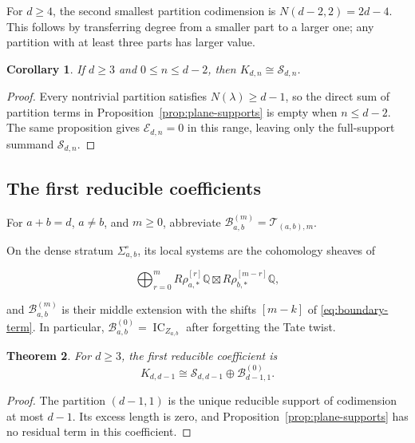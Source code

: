 \documentclass[11pt,reqno]{amsart}
\newtheorem{theorem}{Theorem}[section]
\newtheorem{corollary}[theorem]{Corollary}
\theoremstyle{definition}
\newcommand{\Q}{\mathbb Q}
\newcommand{\IC}{\operatorname{IC}}
\begin{document}
For $d\ge4$, the second smallest partition codimension is
$N(d-2,2)=2d-4$.  This follows by transferring degree from a smaller part to
a larger one; any partition with at least three parts has larger value.

\begin{corollary}\label{cor:before-first-boundary}
If $d\ge3$ and $0\le n\le d-2$, then
$K_{d,n}\cong\mathcal S_{d,n}$.
\end{corollary}

\begin{proof}
Every nontrivial partition satisfies $N(\lambda)\ge d-1$, so the direct sum
of partition terms in Proposition~\ref{prop:plane-supports} is empty when
$n\le d-2$.  The same proposition gives $\mathcal E_{d,n}=0$ in this range,
leaving only the full-support summand $\mathcal S_{d,n}$.
\end{proof}

\subsection{The first reducible coefficients}

For $a+b=d$, $a\ne b$, and $m\ge0$, abbreviate
$\mathcal B_{a,b}^{(m)}=\mathcal T_{(a,b),m}$.

On the dense stratum $\Sigma_{a,b}^\circ$, its local systems are the
cohomology sheaves of

\begin{equation}\label{eq:two-component-local-complex}
  \bigoplus_{r=0}^{m}
  R\rho_{a,*}^{[r]}\Q
  \boxtimes
  R\rho_{b,*}^{[m-r]}\Q,
\end{equation}

and $\mathcal B_{a,b}^{(m)}$ is their middle extension with the shifts
$[m-k]$ of \eqref{eq:boundary-term}.  In particular,
$\mathcal B_{a,b}^{(0)}=\IC_{Z_{a,b}}$ after forgetting the Tate twist.

\begin{theorem}\label{thm:plane-first-window}
For $d\ge3$, the first reducible coefficient is
\begin{equation}\label{eq:first-plane-boundary}
 K_{d,d-1}
 \cong
 \mathcal S_{d,d-1}\oplus\mathcal B_{d-1,1}^{(0)}.
\end{equation}
\end{theorem}

\begin{proof}
The partition $(d-1,1)$ is the unique reducible support of codimension at
most $d-1$.  Its excess length is zero, and
Proposition~\ref{prop:plane-supports} has no residual term in this
coefficient.
\end{proof}
\end{document}
